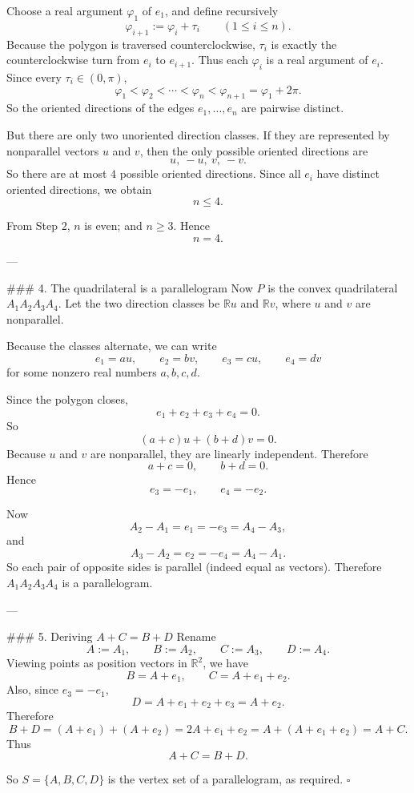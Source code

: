 Choose a real argument \(\varphi_1\) of \(e_1\), and define recursively
\[
\varphi_{i+1}:=\varphi_i+\tau_i \qquad (1\le i\le n).
\]
Because the polygon is traversed counterclockwise, \(\tau_i\) is exactly the counterclockwise turn from \(e_i\) to \(e_{i+1}\). Thus each \(\varphi_i\) is a real argument of \(e_i\). Since every \(\tau_i\in(0,\pi)\),
\[
\varphi_1<\varphi_2<\cdots<\varphi_n<\varphi_{n+1}=\varphi_1+2\pi.
\]
So the oriented directions of the edges \(e_1,\dots,e_n\) are pairwise distinct.

But there are only two unoriented direction classes. If they are represented by nonparallel vectors \(u\) and \(v\), then the only possible oriented directions are
\[
u,\ -u,\ v,\ -v.
\]
So there are at most \(4\) possible oriented directions. Since all \(e_i\) have distinct oriented directions, we obtain
\[
n\le 4.
\]

From Step \(2\), \(n\) is even; and \(n\ge 3\). Hence
\[
n=4.
\]

---

### 4. The quadrilateral is a parallelogram
Now \(P\) is the convex quadrilateral \(A_1A_2A_3A_4\). Let the two direction classes be \(\mathbb{R}u\) and \(\mathbb{R}v\), where \(u\) and \(v\) are nonparallel.

Because the classes alternate, we can write
\[
e_1=a u,\qquad e_2=b v,\qquad e_3=c u,\qquad e_4=d v
\]
for some nonzero real numbers \(a,b,c,d\).

Since the polygon closes,
\[
e_1+e_2+e_3+e_4=0.
\]
So
\[
(a+c)u+(b+d)v=0.
\]
Because \(u\) and \(v\) are nonparallel, they are linearly independent. Therefore
\[
a+c=0,\qquad b+d=0.
\]
Hence
\[
e_3=-e_1,\qquad e_4=-e_2.
\]

Now
\[
A_2-A_1=e_1=-e_3=A_4-A_3,
\]
and
\[
A_3-A_2=e_2=-e_4=A_4-A_1.
\]
So each pair of opposite sides is parallel (indeed equal as vectors). Therefore \(A_1A_2A_3A_4\) is a parallelogram.

---

### 5. Deriving \(A+C=B+D\)
Rename
\[
A:=A_1,\qquad B:=A_2,\qquad C:=A_3,\qquad D:=A_4.
\]
Viewing points as position vectors in \(\mathbb{R}^2\), we have
\[
B=A+e_1,\qquad C=A+e_1+e_2.
\]
Also, since \(e_3=-e_1\),
\[
D=A+e_1+e_2+e_3=A+e_2.
\]
Therefore
\[
B+D=(A+e_1)+(A+e_2)=2A+e_1+e_2=A+(A+e_1+e_2)=A+C.
\]
Thus
\[
A+C=B+D.
\]

So \(S=\{A,B,C,D\}\) is the vertex set of a parallelogram, as required. \(\square\)